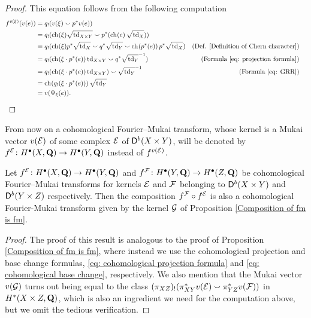 \begin{proof}
    This equation follows from the following computation
    \begin{align*}
        \fmcoh{v(\xi)}(v(e)) &=
        q_!(v(\xi) \smallsmile p^*v(e)) \\
        &= q_!(\ch[](\xi)\sqrt{\tdclass{X \times Y}} \smallsmile p^*(\ch[]{e}\sqrt{\tdclass{X}})) \\
        &= q_!(\ch[](\xi)p^*\sqrt{\tdclass{X}} \smallsmile q^*\sqrt{\tdclass{Y}} \smallsmile \ch[]{p^*(e)}p^*\sqrt{\tdclass{X}}) & \text{(Def. \ref{Definition of Chern character})} \\
        &= q_!(\ch[](\xi \cdot p^*(e))\tdclass{X \times Y} \smallsmile q^*\sqrt{\tdclass{Y}}\inv) & \text{(Formula \eqref{eq: projection formula})}\\
        &= q_!(\ch[](\xi \cdot p^*(e))\tdclass{X \times Y}) \smallsmile \sqrt{\tdclass{Y}}\inv & \text{(Formula \eqref{eq: GRR})} \\
        &= \ch[]{q_!(\xi \cdot p^*(e))}\sqrt{\tdclass{Y}} \\
        &= v(\fmkt{\xi}(e)). & & \qedhere
    \end{align*}
\end{proof}

From now on a cohomological Fourier--Mukai transform, whose kernel is a Mukai vector $v(\mathcal E)$ of some complex $\mathcal E$ of $\mathsf{D}^b(X \times Y)$, will be denoted by $f^{\mathcal E} \colon H^{\bullet}(X, \mathbf Q) \to H^{\bullet}(Y, \mathbf Q)$ instead of $f^{v(\mathcal E)}$.   

\begin{proposition}
    \label{Composition of cohomological fm is fm}
    Let $f^{\mathcal E} \colon H^\bullet(X, \mathbf Q) \to H^\bullet(Y, \mathbf Q)$ and $f^{\mathcal F} \colon H^\bullet(Y, \mathbf Q) \to H^\bullet(Z, \mathbf Q)$ be cohomological Fourier--Mukai transforms for kernels $\mathcal E$ and $\mathcal F$ belonging to $\mathsf{D}^b(X \times Y)$ and $\mathsf{D}^b(Y \times Z)$ respectively. Then the composition $f^{\mathcal F} \circ f^{\mathcal E}$ is also a cohomological Fourier-Mukai transform given by the kernel $\mathcal G$ of Proposition \ref{Composition of fm is fm}.
\end{proposition}

\begin{proof}
    The proof of this result is analogous to the proof of Proposition \ref{Composition of fm is fm}, where instead we use the cohomological projection and base change formulas, \eqref{eq: cohomological projection formula} and \eqref{eq: cohomological base change}, respectively. We also mention that the Mukai vector $v(\mathcal G)$ turns out being equal to the class $(\pi_{XZ})_!(\pi_{XY}^*v(\mathcal E) \smallsmile \pi_{YZ}^*v(\mathcal F))$ in $H^{*}(X \times Z, \mathbf Q)$, which is also an ingredient we need for the computation above, but we omit the tedious verification.
\end{proof}

